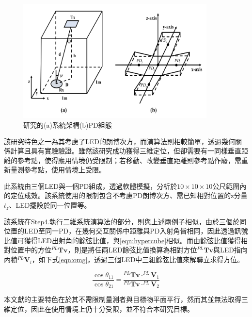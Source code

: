 \begin{description}
        \begin{figure}[htpb]
            \centering
            \includegraphics[width=10cm]{ch2pic/case_cart3d.png}
            \caption{\cite{case:cart3d}研究的(a)系統架構(b)PD組態}
            \label{pic:case_cart3d}
        \end{figure}

        該研究特色之一為其考慮了LED的朗博次方，而演算法則相較簡單，透過幾何關係計算且具有實驗驗證。雖然該研究成功獲得三維定位，但卻需要有一同樣垂直距離的參考點，使得應用情境仍受限制；若移動、改變垂直距離則參考點作廢，需重新量測參考點，使用情境上受限。



        \item[\cite{omg_new}]\hfill
        
        此系統由三個LED與一個PD組成，透過軟體模擬，分析於$10\times 10\times 10$公尺範圍內的定位成效。該系統使用的限制包含不考慮PD朗博次方、需已知相對位置的z分量$t_z$、LED擺設於同一位置等。

        該系統在Step4.執行二維系統演算法的部分，則與上述兩例子相似，由於三個於同位置的LED至同一PD，在幾何交互關係中距離與PD入射角皆相同，因此透過訊號比值可獲得LED出射角的餘弦比值，與\ref{eqn:hypercube}相似。而由餘弦比值獲得相對位置中的方位$^{PL}\boldsymbol{Tv}$，則是將任兩LED餘弦比值換算為相對方位$^{PL}\boldsymbol{Tv}$與LED指向內積$^{PL}\boldsymbol{V}_l$，如下式\ref{eqn:omg}，透過三個LED中三組餘弦比值來解聯立求得方位。
        
        \begin{equation}
            \label{eqb:omg}
            \frac{\cos\theta_{11}}{\cos\theta_{21}}=\frac{^{PL}\boldsymbol{Tv}\cdot^{PL}\boldsymbol{V}_1 }{^{PL}\boldsymbol{Tv}\cdot^{PL}\boldsymbol{V}_2 }
        \end{equation}

        本文獻的主要特色在於其不需限制量測者與目標物平面平行，然而其並無法取得三維定位，因此在使用情境上仍十分受限，並不符合本研究目標。
        
        

    \end{description}

